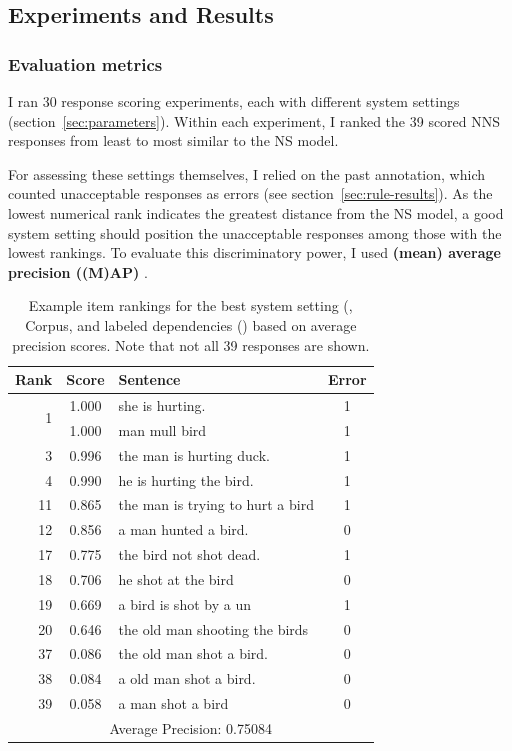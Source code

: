 \subsection{Experiments and Results}
\label{sec:metrics}
\subsubsection{Evaluation metrics}

I ran 30 response scoring experiments, each with different system settings
(section~\ref{sec:parameters}). Within each experiment, I ranked the 39
scored NNS responses from least to most similar to the NS model.

For assessing these settings themselves, I relied on the past annotation, which counted unacceptable responses as errors (see section~\ref{sec:rule-results}).  As the lowest numerical rank indicates the greatest distance from the NS model, a good system setting should position the unacceptable responses among those with the lowest rankings.
To evaluate this discriminatory power, I used \textbf{(mean) average precision ((M)AP)}
\citep[][ch. 8]{manning-et-al:08}.

\begin{table}[htb!]
\begin{center}
\setlength{\tabcolsep}{0.3em}
\begin{tabular}{|r|c|l|c|}
\hline
Rank & Score & Sentence & Error \\
\hline
\hline
\multirow{2}{*}{1} & 1.000 & she is hurting. & 1 \\
& 1.000 & man mull bird & 1 \\
\hline
3 & 0.996 & the man is hurting duck. & 1 \\
4 & 0.990 & he is hurting the bird. & 1 \\
\hline
11 & 0.865 & the man is trying to hurt a bird & 1 \\
12 & 0.856 & a man hunted a bird. & 0 \\
\hline
17 & 0.775 & the bird not shot dead.  & 1 \\
18 & 0.706 & he shot at the bird & 0 \\
19 & 0.669 & a bird is shot by a un & 1 \\
20 & 0.646 & the old man shooting the birds & 0 \\
\hline
37 & 0.086 & the old man shot a bird. & 0 \\
38 & 0.084 & a old man shot a bird. & 0 \\
39 & 0.058 & a man shot a bird & 0 \\
\hline
\hline
\multicolumn{4}{|c|}{Average Precision: 0.75084} \\
\hline
\end{tabular}
\caption{Example item rankings for the best system setting (,  Corpus, and labeled dependencies () based on average precision scores. Note that not all 39 responses are shown.}
\label{tab:i10responses-avgprec}
\end{center}
\end{table}

